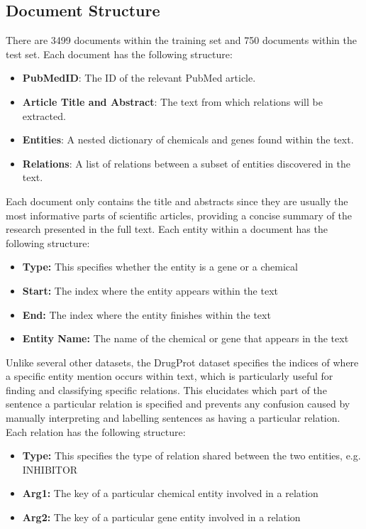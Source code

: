 \documentclass{l4proj}
\begin{document}
\subsection{Document Structure}

There are 3499 documents within the training set and 750 documents within the test set. Each document has the following structure:
\begin{itemize}
    \item \textbf{PubMedID}: The ID of the relevant PubMed article.
    \item \textbf{Article Title and Abstract}: The text from which relations will be extracted.
    \item \textbf{Entities}: A nested dictionary of chemicals and genes found within the text.
    \item \textbf{Relations}: A list of relations between a subset of entities discovered in the text.
\end{itemize}

Each document only contains the title and abstracts since they are usually the most informative parts of scientific articles, providing a concise summary of the research presented in the full text. Each entity within a document has the following structure:
\begin{itemize}
    \item \textbf{Type:} This specifies whether the entity is a gene or a chemical
    \item \textbf{Start:} The index where the entity appears within the text
    \item \textbf{End:} The index where the entity finishes within the text
    \item \textbf{Entity Name:} The name of the chemical or gene that appears in the text
\end{itemize}

Unlike several other datasets, the DrugProt dataset specifies the indices of where a specific entity mention occurs within text, which is particularly useful for finding and classifying specific relations. This elucidates which part of the sentence a particular relation is specified and prevents any confusion caused by manually interpreting and labelling sentences as having a particular relation. Each relation has the following structure:
\begin{itemize}
    \item \textbf{Type:} This specifies the type of relation shared between the two entities, e.g. INHIBITOR
    \item \textbf{Arg1:} The key of a particular chemical entity involved in a relation
    \item \textbf{Arg2:} The key of a particular gene entity involved in a relation
\end{itemize}
\end{document}
